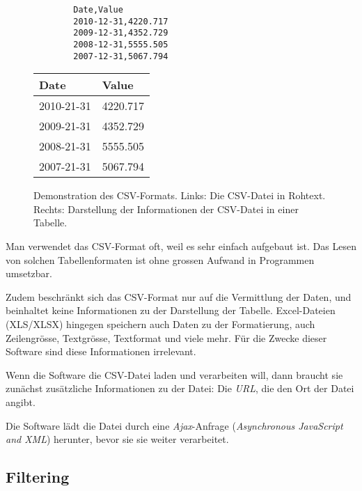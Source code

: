 \begin{figure}[!htbp]
	\centering
	\begin{minipage}{0.5\textwidth}
		\centering
		\begin{lstlisting}
		Date,Value
		2010-12-31,4220.717
		2009-12-31,4352.729
		2008-12-31,5555.505
		2007-12-31,5067.794
		\end{lstlisting}
	\end{minipage}\hfill
	\begin{minipage}{0.5\textwidth}
		\centering
		\begin{tabular}{ | l | l |}
			\hline
			\textbf{Date} & \textbf{Value} \\ \hline
			2010-21-31 & 4220.717 \\ \hline
			2009-21-31 & 4352.729 \\ \hline
			2008-21-31 & 5555.505 \\ \hline
			2007-21-31 & 5067.794 \\ \hline
		\end{tabular}
	\end{minipage}
	\caption[Demonstration des CSV-Formats]{Demonstration des CSV-Formats. Links: Die CSV-Datei in Rohtext. Rechts: Darstellung der Informationen der CSV-Datei in einer Tabelle.}
	\label{fig:csv}
\end{figure}

Man verwendet das CSV-Format oft, weil es sehr einfach aufgebaut ist. Das Lesen von solchen Tabellenformaten ist ohne grossen Aufwand in Programmen umsetzbar. 

 Zudem beschränkt sich das CSV-Format nur auf die Vermittlung der Daten, und beinhaltet keine Informationen zu der Darstellung der Tabelle. Excel-Dateien (XLS/XLSX) hingegen speichern auch Daten zu der Formatierung, auch Zeilengrösse, Textgrösse, Textformat und viele mehr. Für die Zwecke dieser Software sind diese Informationen irrelevant.
 
 
Wenn die Software die CSV-Datei laden und verarbeiten will, dann braucht sie zunächst zusätzliche Informationen zu der Datei: Die \textit{URL}, die den Ort der Datei angibt.

Die Software lädt die Datei durch eine \textit{Ajax}-Anfrage (\textit{Asynchronous JavaScript and XML}) herunter, bevor sie sie weiter verarbeitet.

\subsection{Filtering}

